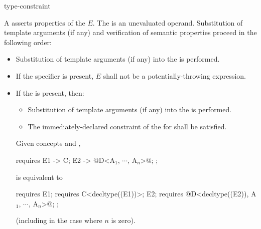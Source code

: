 \begin{bnf}
\br
    \terminal{->} type-constraint
\end{bnf}

\pnum
A  asserts properties
of the  $E$.
The  is an unevaluated operand.
Substitution
of template arguments (if any) and verification of
semantic properties proceed in the following order:

\begin{itemize}
\item
Substitution of template arguments (if any)
into the  is performed.

\item
If the  specifier is present,
$E$ shall not be a potentially-throwing expression.

\item
If the  is present, then:

\begin{itemize}
\item
Substitution of template arguments (if any)
into the  is performed.

\item
The immediately-declared constraint
of the  for 
shall be satisfied.
\end{itemize}
\begin{example}
Given concepts  and ,
\begin{codeblock}
requires {
  { E1 } -> C;
  { E2 } -> @D<A$_1$, $\cdots$, A$_n$>@;
};
\end{codeblock}
is equivalent to
\begin{codeblock}
requires {
  E1; requires C<decltype((E1))>;
  E2; requires @D<decltype((E2)), A$_1$, $\cdots$, A$_n$>@;
};
\end{codeblock}
(including in the case where $n$ is zero).
\end{example}
\end{itemize}
\pnum
